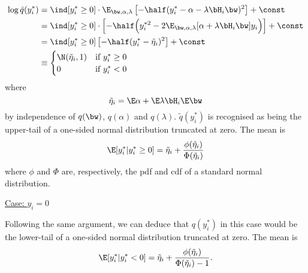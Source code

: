 \begin{align*}
  \log \tilde q(y_i^*) 
  &=  \ind[y_i^* \geq 0] \cdot \E_{\bw, \alpha, \lambda} \left[ -\half (y_i^* - \alpha - \lambda \bH_i \bw)^2  \right] + \const \\
  &= \ind[y_i^* \geq 0] \cdot \left[ -\half \Big( y_i^{*2} - 2\E_{\bw, \alpha, \lambda} [\alpha + \lambda \bH_i \bw] y_i \Big)  \right] + \const \\
  &= \ind[y_i^* \geq 0]  \left[ -\half (y_i^* - \tilde\eta_i)^2  \right] + \const \\
  &\equiv 
  \begin{cases}
    \N(\tilde\eta_i, 1) & \text{if } y_i^* \geq 0 \\
    0             & \text{if } y_i^* < 0
  \end{cases}
\end{align*}
where 
\[
  \tilde\eta_i = \E\alpha + \E\lambda \bH_i \E\bw
\]
by independence of $q(\bw)$, $q(\alpha)$ and $q(\lambda)$. $\tilde q(y_i^*)$ is recognised as being the upper-tail of a one-sided normal distribution truncated at zero. The mean is 
\[
  \E[y_i^* | y_i^* \geq 0] = \tilde\eta_i + \frac{\phi(\tilde\eta_i)}{\Phi(\tilde\eta_i)}
\]
where $\phi$ and $\Phi$ are, respectively, the pdf and cdf of a standard normal distribution.

\underline{Case: $y_i = 0$}

Following the same argument, we can deduce that $q(y_i^*)$ in this case would be the lower-tail of a one-sided normal distribution truncated at zero. The mean is
\[
  \E[y_i^* | y_i^* < 0] = \tilde\eta_i + \frac{\phi(\tilde\eta_i)}{\Phi(\tilde\eta_i) - 1}.
\]
